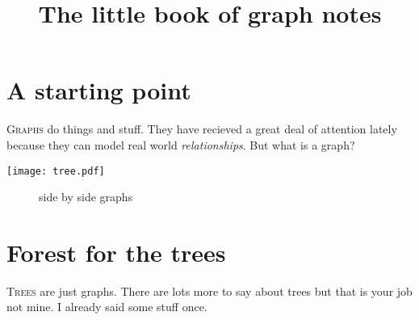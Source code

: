 \documentclass{book}
\title{The little book of graph notes}
\begin{document}
\maketitle
\chapter{A starting point}
\lettrine[lines=4]{G}{raphs} do things and stuff.  They have recieved a great
deal of attention lately because they can model real world \textit{relationships}.  But what is
a graph?  

\texttt{[image: tree.pdf]}

\begin{figure}%
    \centering
    \qquad

    \caption{side by side graphs}%
    \label{fig:k5}%
\end{figure}

\chapter{Forest for the trees}
\lettrine[lines=4]{T}{rees} are just graphs. There are lots more to say about trees but that is
your job not mine. I already said some stuff once.
\end{document}
